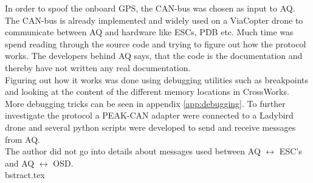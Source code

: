 In order to spoof the onboard GPS, the CAN-bus was chosen as input to AQ. 
The CAN-bus is already implemented and widely used on a ViaCopter drone to communicate between AQ and hardware like ESCs, PDB etc. Much time was spend reading through the source code and trying to figure out how the protocol works.
The developers behind AQ says, that the code is the documentation and thereby have not written any real documentation. \\
Figuring out how it works was done using debugging utilities such as breakpoints and looking at the content of the different memory locations in CrossWorks.\\
More debugging tricks can be seen in appendix \ref{app:debugging}. 
To further investigate the protocol a PEAK-CAN adapter were connected to a Ladybird drone and several python scripts were developed to send and receive messages from AQ. \\
The author did not go into details about messages used between AQ $\leftrightarrow$ ESC's and AQ $\leftrightarrow$ OSD.\\


bstract.tex
